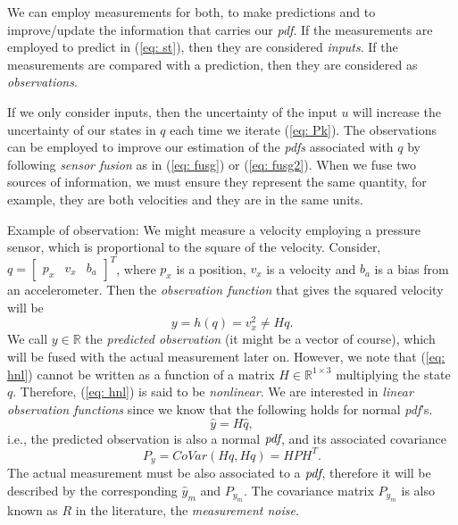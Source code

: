 \documentclass[11pt,a4paper]{article}
\begin{document}
We can employ measurements for both, to make predictions and to improve/update the information that carries our \emph{pdf}. If the measurements are employed to predict in (\ref{eq: st}), then they are considered \emph{inputs}. If the measurements are compared with a prediction, then they are considered as \emph{observations}.

If we only consider inputs, then the uncertainty of the input $u$ will increase the uncertainty of our states in $q$ each time we iterate (\ref{eq: Pk}). The observations can be employed to improve our estimation of the \emph{pdfs} associated with $q$ by following \emph{sensor fusion} as in (\ref{eq: fusg}) or (\ref{eq: fusg2}). When we fuse two sources of information, we must ensure they represent the same quantity, for example, they are both velocities and they are in the same units.

Example of observation: We might measure a velocity employing a pressure sensor, which is proportional to the square of the velocity. Consider, $q = \begin{bmatrix} p_x & v_x & b_a \end{bmatrix}^T$, where $p_x$ is a position, $v_x$ is a velocity and $b_a$ is a bias from an accelerometer. Then the \emph{observation function} that gives the squared velocity will be
\begin{equation}
y = h(q) = v_x^2 \neq H q.
\label{eq: hnl}
\end{equation}
We call $y\in\mathbb{R}$ the \emph{predicted observation} (it might be a vector of course), which will be fused with the actual measurement later on. However, we note that (\ref{eq: hnl}) cannot be written as a function of a matrix $H\in\mathbb{R}^{1\times 3}$ multiplying the state $q$. Therefore, (\ref{eq: hnl}) is said to be \emph{nonlinear}. We are interested in \emph{linear observation functions} since we know that the following holds for normal \emph{pdf}'s.
\begin{equation}
\hat y = H \hat q,
\end{equation}
i.e., the predicted observation is also a normal $\emph{pdf}$, and its associated covariance
\begin{equation}
	P_y = CoVar(Hq, Hq) = HPH^T.
\end{equation}
The actual measurement must be also associated to a $\emph{pdf}$, therefore it will be described by the corresponding $\hat y_m$ and $P_{y_m}$. The covariance matrix $P_{y_m}$ is also known as $R$ in the literature, the \emph{measurement noise}.
\end{document}
